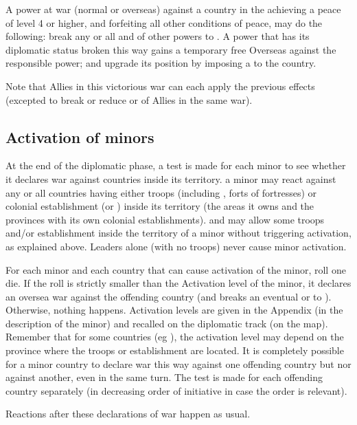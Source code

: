 \aparag A power at war (normal or overseas) against a country in the
\ROTW achieving a peace of level 4 or higher, and forfeiting all other
conditions of peace, may do the following:
\bparag break any or all \dipAT and \dipFR of other powers to \dipNR.
A power that has its diplomatic status  broken this way gains a temporary
free Overseas \CB against the responsible power;
\bparag and upgrade its position by imposing a \dipAT to the \ROTW country.

\aparag Note that Allies in this victorious war can each apply the
previous effects (excepted to break or reduce \dipFR or \dipAT of
Allies in the same war).

\subsection{Activation of \ROTW minors}
\aparag At the end of the diplomatic phase, a test is made for each
\ROTW minor to see whether it declares war against countries inside its
territory.
\bparag a \ROTW minor may react against any or all countries having
either troops (including \LDE, forts of fortresses) or colonial
establishment (\COL or \TP) inside its territory (the areas it owns and
the provinces with its own colonial establishments).
\bparag \dipFR and \dipAT may allow some troops and/or establishment
inside the territory of a minor without triggering activation, as
explained above.
\bparag Leaders alone (with no troops) never cause minor activation.

\aparag For each minor and each country that can cause activation of the
minor, roll one die.
\bparag If the roll is strictly smaller than the Activation level of the
minor, it declares an oversea war against the offending country (and
breaks an eventual \dipAT or \dipFR to \dipNR).
\bparag Otherwise, nothing happens.
\bparag Activation levels are given in the Appendix (in the description
of the minor) and recalled on the \ROTW diplomatic track (on the \ROTW
map).
\bparag Remember that for some countries (eg \paysChina), the activation
level may depend on the province where the troops or establishment are
located.
\bparag It is completely possible for a minor country to declare war
this way against one offending country  but nor against another, even in
the same turn. The test is made for each offending country separately
(in decreasing order of initiative in case the order is relevant).

\aparag Reactions after these declarations of war happen as usual.

